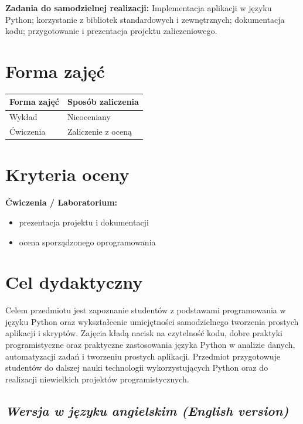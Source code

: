 \documentclass[12pt, a4paper]{article}
\newcommand{\thdrule}{\noalign{\global\setlength{\extrarowheight}{0pt}}}
\newcommand{\thdend}{\noalign{\global\setlength{\extrarowheight}{3pt}}}
\begin{document}
\vspace{4pt}
\noindent\textbf{Zadania do samodzielnej realizacji:} Implementacja aplikacji w języku Python; korzystanie z bibliotek standardowych i zewnętrznych; dokumentacja kodu; przygotowanie i prezentacja projektu zaliczeniowego.

\section{Forma zajęć}

\begin{center}
{\scriptsize
\begin{tabular}{m{5cm}m{8cm}}
\thdrule\toprule
\rowcolor{pjatkRed} {\color{white}\textbf{Forma zajęć}} & {\color{white}\textbf{Sposób zaliczenia}} \\
\midrule\thdend
  \rowcolor{tableRowLight} Wykład & Nieoceniany \\
  \rowcolor{tableRowAlt} Ćwiczenia & Zaliczenie z oceną \\
\bottomrule
\end{tabular}}
\end{center}

\section{Kryteria oceny}

\textbf{Ćwiczenia / Laboratorium:}
\begin{itemize}
  \item prezentacja projektu i dokumentacji
  \item ocena sporządzonego oprogramowania
\end{itemize}


\section{Cel dydaktyczny}

Celem przedmiotu jest zapoznanie studentów z podstawami programowania w języku Python oraz wykształcenie umiejętności samodzielnego tworzenia prostych aplikacji i skryptów. Zajęcia kładą nacisk na czytelność kodu, dobre praktyki programistyczne oraz praktyczne zastosowania języka Python w analizie danych, automatyzacji zadań i tworzeniu prostych aplikacji. Przedmiot przygotowuje studentów do dalszej nauki technologii wykorzystujących Python oraz do realizacji niewielkich projektów programistycznych.

\subsection*{\textit{Wersja w języku angielskim (English version)}}
\end{document}
